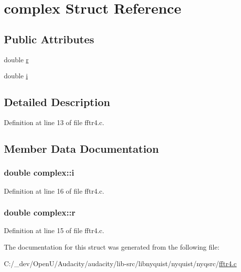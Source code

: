 \hypertarget{structcomplex}{}\section{complex Struct Reference}
\label{structcomplex}
\subsection*{Public Attributes}
\begin{DoxyCompactItemize}
\item 
double \hyperlink{structcomplex_ae9358b73847641f8584135907f2ccdc2}{r}
\item 
double \hyperlink{structcomplex_a064e4f0a69b5d424fc74c7f7606504b6}{i}
\end{DoxyCompactItemize}


\subsection{Detailed Description}


Definition at line 13 of file fftr4.\+c.



\subsection{Member Data Documentation}
\subsubsection[{\texorpdfstring{i}{i}}]{\setlength{\rightskip}{0pt plus 5cm}double complex\+::i}\hypertarget{structcomplex_a064e4f0a69b5d424fc74c7f7606504b6}{}\label{structcomplex_a064e4f0a69b5d424fc74c7f7606504b6}


Definition at line 16 of file fftr4.\+c.

\subsubsection[{\texorpdfstring{r}{r}}]{\setlength{\rightskip}{0pt plus 5cm}double complex\+::r}\hypertarget{structcomplex_ae9358b73847641f8584135907f2ccdc2}{}\label{structcomplex_ae9358b73847641f8584135907f2ccdc2}


Definition at line 15 of file fftr4.\+c.



The documentation for this struct was generated from the following file\+:\begin{DoxyCompactItemize}
\item 
C\+:/\+\_\+dev/\+Open\+U/\+Audacity/audacity/lib-\/src/libnyquist/nyquist/nyqsrc/\hyperlink{fftr4_8c}{fftr4.\+c}\end{DoxyCompactItemize}
